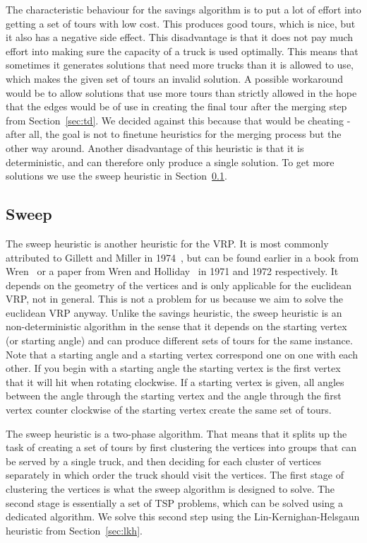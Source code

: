 \documentclass[titlepage, 12pt]{article}
\begin{document}
    The characteristic behaviour for the savings algorithm is to put a lot of effort into getting a
    set of tours with low cost. This produces good tours, which is nice, but it also has a negative
    side effect. This disadvantage is that it does not pay much effort into making sure the capacity
    of a truck is used optimally. This means that sometimes it generates solutions that need more
    trucks than it is allowed to use, which makes the given set of tours an invalid solution. A
    possible workaround would be to allow solutions that use more tours than strictly allowed in the
    hope that the edges would be of use in creating the final tour after the merging step from
    Section~\ref{sec:td}. We decided against this because that would be cheating - after all, the
    goal is not to finetune heuristics for the merging process but the other way around.
    Another disadvantage of this heuristic is that it is deterministic, and can therefore
    only produce a single solution. To get more solutions we use the sweep heuristic in
    Section~\ref{sec:sweep}.


    \subsection{Sweep}
    \label{sec:sweep}
    The sweep heuristic is another heuristic for the VRP\@.  It is most commonly attributed to
    Gillett and Miller in 1974~\cite{sweep}, but can be found earlier in a book from
    Wren~\cite{sweep-orig-1} or a paper from Wren and Holliday~\cite{sweep-orig-2} in 1971 and 1972
    respectively.
    It depends on the geometry of the vertices and is only applicable for the euclidean VRP, not in
    general. This is not a problem for us because we aim to solve the euclidean VRP anyway. Unlike
    the savings heuristic, the sweep heuristic is an non-deterministic algorithm in the sense that
    it depends on the starting vertex (or starting angle) and can produce different sets of tours
    for the same instance.
    Note that a starting angle and a starting vertex correspond one on one with each other. If you
    begin with a starting angle the starting vertex is the first vertex that it will hit when
    rotating clockwise. If a starting vertex is given, all angles between the angle through the
    starting vertex and the angle through the first vertex counter clockwise of the starting vertex
    create the same set of tours.

    The sweep heuristic is a two-phase algorithm. That means that it splits up the task of creating
    a set of tours by first clustering the vertices into groups that can be served by a single
    truck, and then deciding for each cluster of vertices separately in which order the truck should
    visit the vertices. The first stage of clustering the vertices is what the sweep algorithm is
    designed to solve. The second stage is essentially a set of TSP problems, which can be solved
    using a dedicated algorithm. We solve this second step using the Lin-Kernighan-Helsgaun
    heuristic from Section~\ref{sec:lkh}.
\end{document}
